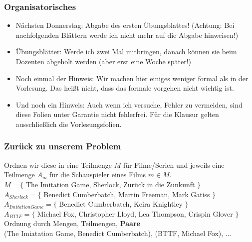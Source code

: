 




\graphicspath{{../figures/}}



\begin{frame}
	\frametitle{Organisatorisches}
	
	\begin{itemize}
		\item Nächsten Donnerstag: Abgabe des ersten Übungsblattes! (Achtung: Bei nachfolgenden Blättern werde ich nicht mehr auf die Abgabe hinweisen!)
		\item Übungsblätter: Werde ich zwei Mal mitbringen, danach können sie beim Dozenten abgeholt werden (aber erst eine Woche später!)
		\item Noch einmal der Hinweis: Wir machen hier einiges weniger formal als in der Vorlesung. Das heißt nicht, dass das formale vorgehen nicht wichtig ist.
		\item Und noch ein Hinweis: Auch wenn ich versuche, Fehler zu vermeiden, sind diese Folien unter Garantie nicht fehlerfrei. Für die Klausur gelten ausschließlich die Vorlesungsfolien.
	\end{itemize}
\end{frame}

\framePrevEpisode

\begin{frame}
	\frametitle{Zurück zu unserem Problem}
	Ordnen wir diese in eine Teilmenge $M$ für Filme/Serien und jeweils eine Teilmenge $A_m$ für die Schauspieler eines Films $m \in M$. \\[0.5em]
	$M = \{$ The Imitation Game, Sherlock, Zurück in die Zunkunft $\}$ \\[0.3em]
	$A_{Sherlock} = \{$ Benedict Cumberbatch, Martin Freeman, Mark Gatiss $\}$ \\
	$A_{Imitation Game} = \{$ Benedict Cumberbatch, Keira Knightley $\}$ \\
	$A_{BTTF} = \{$ Michael Fox, Christopher Lloyd, Lea Thompson, Crispin Glover $\}$ \\[2em]
	
	Ordnung durch Mengen, Teilmengen, \textbf{Paare}\\ \pause
	(The Imiatation Game, Benedict Cumberbatch), (BTTF, Michael Fox), ...
	
\end{frame}

